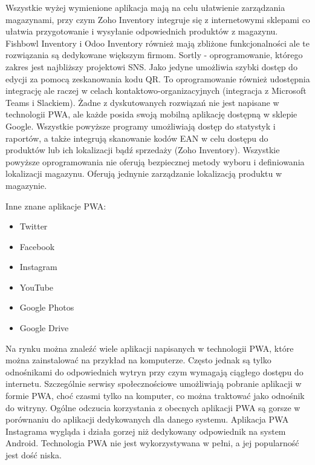 \documentclass[../main.tex]{subfiles}
\begin{document}
Wszystkie wyżej wymienione aplikacja mają na celu ułatwienie zarządzania magazynami, przy czym Zoho Inventory integruje się z internetowymi sklepami co ułatwia przygotowanie i wysyłanie odpowiednich produktów z magazynu. Fishbowl Inventory i Odoo Inventory również mają zbliżone funkcjonalności ale te rozwiązania są dedykowane większym firmom. Sortly - oprogramowanie, którego zakres jest najbliższy projektowi SNS. Jako jedyne umożliwia szybki dostęp do edycji za pomocą zeskanowania kodu QR. To oprogramowanie również udostępnia integrację ale raczej w celach kontaktowo-organizacyjnych (integracja z Microsoft Teams i Slackiem). Żadne z dyskutowanych rozwiązań nie jest napisane w technologii PWA, ale każde posida swoją mobilną aplikację dostępną w sklepie Google. Wszystkie powyższe programy umożliwiają dostęp do statystyk i raportów, a także integrują skanowanie kodów EAN w celu dostępu do produktów lub ich lokalizacji bądź sprzedaży (Zoho Inventory). Wszystkie powyższe oprogramowania nie oferują bezpiecznej metody wyboru i definiowania lokalizacji magazynu. Oferują jednynie zarządzanie lokalizacją produktu w magazynie. %

Inne znane aplikacje PWA:
\begin{itemize}
    \item Twitter
    \item Facebook
    \item Instagram
    \item YouTube
    \item Google Photos
    \item Google Drive
\end{itemize}

Na rynku można znaleźć wiele aplikacji napisanych w technologii PWA, które można zainstalować na przykład na komputerze. Często jednak są tylko odnośnikami do odpowiednich wytryn przy czym wymagają ciągłego dostępu do internetu. Szczególnie serwisy społecznościowe umożliwiają pobranie aplikacji w formie PWA, choć czasmi tylko na komputer, co można traktować jako odnośnik do witryny. Ogólne odczucia korzystania z obecnych aplikacji PWA są gorsze w porównaniu do aplikacji dedykowanych dla danego systemu. Aplikacja PWA Instagrama wygląda i działa gorzej niż dedykowany odpowiednik na system Android. Technologia PWA nie jest wykorzystywana w pełni, a jej popularność jest dość niska.
\end{document}
